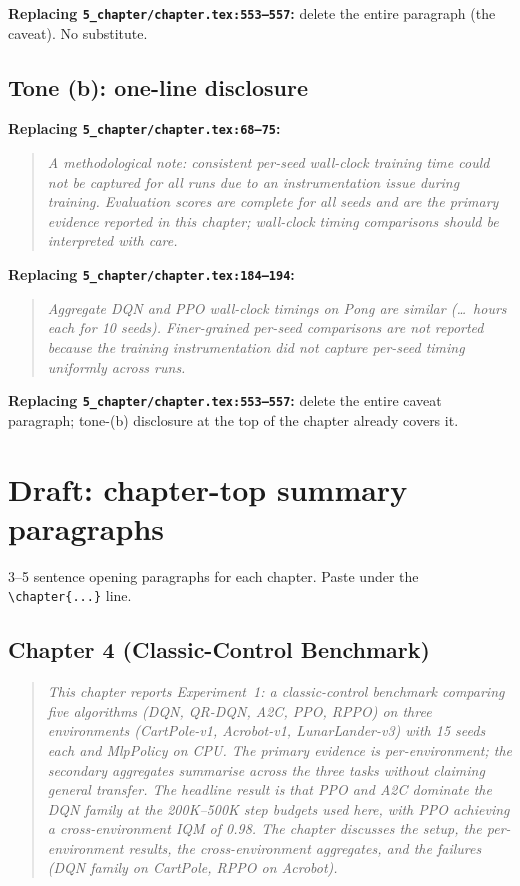 \documentclass[11pt,a4paper]{article}
\newcommand{\fileline}[1]{\texttt{\small #1}}
\begin{document}
\textbf{Replacing \fileline{5\_chapter/chapter.tex:553--557}:} delete
the entire paragraph (the caveat). No substitute.

\subsection*{Tone (b): one-line disclosure}

\textbf{Replacing \fileline{5\_chapter/chapter.tex:68--75}:}

\begin{quote}
\textit{A methodological note: consistent per-seed wall-clock training
time could not be captured for all runs due to an instrumentation issue
during training. Evaluation scores are complete for all seeds and are
the primary evidence reported in this chapter; wall-clock timing
comparisons should be interpreted with care.}
\end{quote}

\textbf{Replacing \fileline{5\_chapter/chapter.tex:184--194}:}

\begin{quote}
\textit{Aggregate DQN and PPO wall-clock timings on Pong are similar
(\ldots\ hours each for 10 seeds). Finer-grained per-seed comparisons
are not reported because the training instrumentation did not capture
per-seed timing uniformly across runs.}
\end{quote}

\textbf{Replacing \fileline{5\_chapter/chapter.tex:553--557}:} delete the
entire caveat paragraph; tone-(b) disclosure at the top of the chapter
already covers it.

\section{Draft: chapter-top summary paragraphs}\label{sec:summaries}

3--5 sentence opening paragraphs for each chapter. Paste under the
\fileline{\textbackslash chapter\{...\}} line.

\subsection*{Chapter 4 (Classic-Control Benchmark)}

\begin{quote}
\textit{This chapter reports Experiment~1: a classic-control benchmark
comparing five algorithms (DQN, QR-DQN, A2C, PPO, RPPO) on three
environments (CartPole-v1, Acrobot-v1, LunarLander-v3) with 15 seeds
each and MlpPolicy on CPU. The primary evidence is per-environment; the
secondary aggregates summarise across the three tasks without claiming
general transfer. The headline result is that PPO and A2C dominate the
DQN family at the 200K--500K step budgets used here, with PPO achieving
a cross-environment IQM of 0.98. The chapter discusses the setup, the
per-environment results, the cross-environment aggregates, and the
failures (DQN family on CartPole, RPPO on Acrobot).}
\end{quote}
\end{document}
